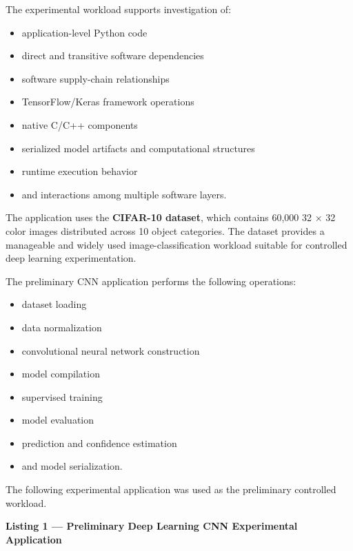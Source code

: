 \documentclass[
  12pt,
  letterpaper,
  oneside]{report}
\providecommand{\tightlist}{%
  \setlength{\itemsep}{0pt}\setlength{\parskip}{0pt}}
\begin{document}
The experimental workload supports investigation of:

\begin{itemize}
\tightlist
\item
  application-level Python code
\item
  direct and transitive software dependencies
\item
  software supply-chain relationships
\item
  TensorFlow/Keras framework operations
\item
  native C/C++ components
\item
  serialized model artifacts and computational structures
\item
  runtime execution behavior
\item
  and interactions among multiple software layers.
\end{itemize}

The application uses the \textbf{CIFAR-10 dataset}, which contains
60,000 32 × 32 color images distributed across 10 object categories. The
dataset provides a manageable and widely used image-classification
workload suitable for controlled deep learning experimentation.

The preliminary CNN application performs the following operations:

\begin{itemize}
\tightlist
\item
  dataset loading
\item
  data normalization
\item
  convolutional neural network construction
\item
  model compilation
\item
  supervised training
\item
  model evaluation
\item
  prediction and confidence estimation
\item
  and model serialization.
\end{itemize}

The following experimental application was used as the preliminary
controlled workload.

\textbf{Listing 1 --- Preliminary Deep Learning CNN Experimental
Application}
\end{document}
